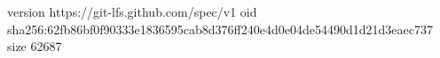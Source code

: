 version https://git-lfs.github.com/spec/v1
oid sha256:62fb86bf0f90333e1836595cab8d376ff240e4d0e04de54490d1d21d3eaec737
size 62687
